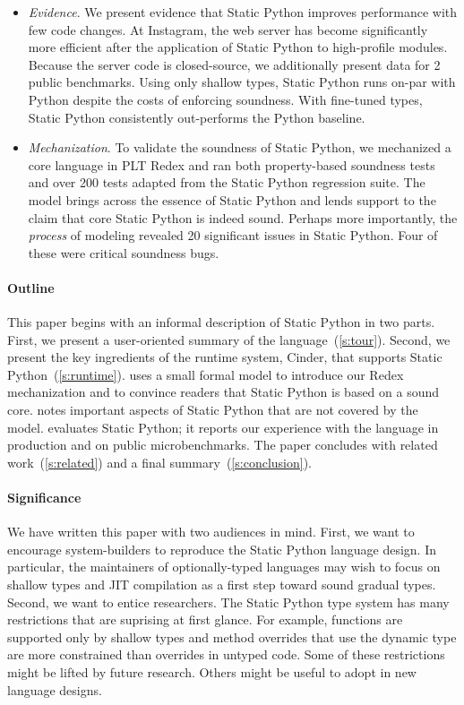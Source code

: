 \documentclass[english,cleveref,submission]{programming}
\newcommand{\SP}{Static Python}
\newcommand{\numbenchmark}{2}
\begin{document}
\begin{itemize}
  \item
    \emph{Evidence}.
    We present evidence that \SP{} improves performance with few code changes.
    At Instagram, the web server has become significantly more efficient
    after the application of \SP{} to high-profile modules.
    Because the server code is closed-source, we additionally present data for
    \numbenchmark{} public benchmarks.
    Using only shallow types, \SP{} runs on-par with Python despite the costs of
    enforcing soundness.
    With fine-tuned types, \SP{} consistently out-performs the Python baseline.

  \item
    \emph{Mechanization}.
    To validate the soundness of \SP{}, we mechanized a core language in PLT Redex
    and ran both property-based soundness tests and over 200 tests adapted from the \SP{} regression suite.
    The model brings across the essence of \SP{} and lends support to the claim
    that core \SP{} is indeed sound.
    Perhaps more importantly, the \emph{process} of modeling revealed 20 significant
    issues in \SP{}.
    Four of these were critical soundness bugs.

\end{itemize}

\paragraph*{Outline}

This paper begins with an informal description of \SP{} in two parts.
First, we present a user-oriented summary of the language~(\cref{s:tour}).
Second, we present the key ingredients of the runtime system, Cinder,
that supports \SP{}~(\cref{s:runtime}).
 uses a small formal model to introduce our Redex mechanization
and to convince readers that \SP{} is based on a sound core.
 notes important aspects of \SP{} that are not covered by the model.
 evaluates \SP{}; it reports our experience with the language in
production and on public microbenchmarks.
The paper concludes with related work~(\cref{s:related})
and a final summary~(\cref{s:conclusion}).


\paragraph*{Significance}

We have written this paper with two audiences in mind.
First, we want to encourage system-builders to reproduce the
\SP{} language design.
In particular, the maintainers of optionally-typed languages
may wish to focus on shallow types and JIT compilation as a
first step toward sound gradual types.
Second, we want to entice researchers.
The \SP{} type system has many restrictions that are suprising
at first glance.
For example, functions are supported only by shallow types
and method overrides that use the dynamic type are more constrained
than overrides in untyped code.
Some of these restrictions might be lifted by future research.
Others might be useful to adopt in new language designs.
\end{document}
